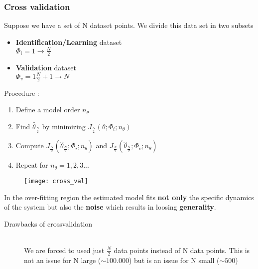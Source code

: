 \subsubsection{Cross validation}
Suppose we have a set of N dataset points. We divide this data set in two subsets
\begin{itemize}
\item \textbf{Identification/Learning} dataset\\
$\Phi_i =1 \to \frac{N}{2}$
\item \textbf{Validation} dataset\\
$\Phi_v =1 \frac{N}{2}+1 \to N$
\end{itemize}
Procedure :
\begin{enumerate}
\item Define a model order $n_{\theta}$
\item Find $\hat{\theta}_{\frac{N}{2}}$ by minimizing $J_{\frac{N}{2}}(\theta;\Phi_i;n_{\theta})$
\item Compute  $J_{\frac{N}{2}}(\hat{\theta}_{\frac{N}{2}};\Phi_i;n_{\theta})$ and $J_{\frac{N}{2}}(\hat{\theta}_{\frac{N}{2}};\Phi_v;n_{\theta})$ 
\item Repeat for $n_{\theta}=1,2,3...$
\end{enumerate}
\begin{figure}[H]
 \centering
  \texttt{[image: cross\_val]}
\end{figure}
In the over-fitting region the estimated model fits \textbf{not only} the specific dynamics of the system but also the \textbf{noise} which results in loosing \textbf{generality}.\\
\begin{description}
\item[Drawbacks of crossvalidation]\hfill\\
We are forced to used just $\frac{N}{2}$ data points instead of N data points.
This is not an issue for N large ($\sim 100.000$) but is an issue for N small ($\sim 500$)
\end{description}


